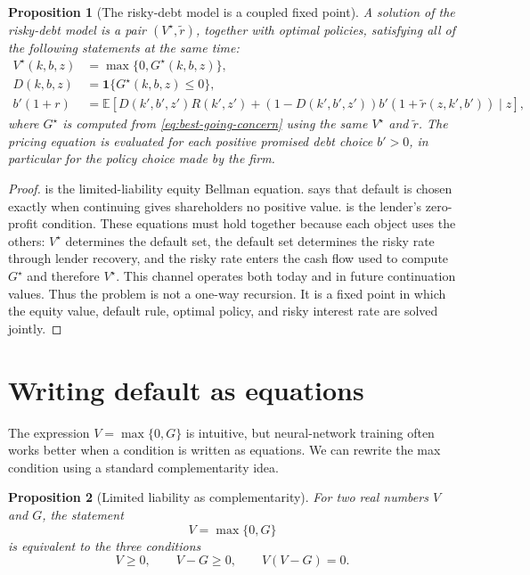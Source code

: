 \documentclass[11pt]{article}
\newtheorem{proposition}{Proposition}
\newcommand{\E}{\mathbb{E}}
\newcommand{\1}{\mathbf{1}}
\begin{document}
\begin{proposition}[The risky-debt model is a coupled fixed point]
\label{prop:coupled-fixed-point}
A solution of the risky-debt model is a pair \((V^\star,\widetilde r)\), together
with optimal policies, satisfying all of the following statements at the same
time:
\begin{align}
  V^\star(k,b,z)
  &=
  \max\{0,G^\star(k,b,z)\}, \label{eq:fixed-point-equity}\\
  D(k,b,z)
  &=
  \1\{G^\star(k,b,z)\le 0\}, \label{eq:fixed-point-default}\\
  b'(1+r)
  &=
  \E\left[
    D(k',b',z')R(k',z')
    +(1-D(k',b',z'))b'(1+\widetilde r(z,k',b'))
    \mid z
  \right],
  \label{eq:fixed-point-pricing}
\end{align}
where \(G^\star\) is computed from \cref{eq:best-going-concern} using the same
\(V^\star\) and \(\widetilde r\). The pricing equation is evaluated for each
positive promised debt choice \(b'>0\), in particular for the policy choice made
by the firm.
\end{proposition}

\begin{proof}
 is the limited-liability equity Bellman equation.
 says that default is chosen exactly when
continuing gives shareholders no positive value. 
is the lender's zero-profit condition. These equations must hold together
because each object uses the others: \(V^\star\) determines the default set, the
default set determines the risky rate through lender recovery, and the risky
rate enters the cash flow used to compute \(G^\star\) and therefore
\(V^\star\). This channel operates both today and in future continuation values.
Thus the problem is not a one-way recursion. It is a fixed point in which the
equity value, default rule, optimal policy, and risky interest rate are solved
jointly.
\end{proof}

\section{Writing default as equations}

The expression \(V=\max\{0,G\}\) is intuitive, but neural-network training often
works better when a condition is written as equations. We can rewrite the max
condition using a standard complementarity idea.

\begin{proposition}[Limited liability as complementarity]
\label{prop:limited-liability-complementarity}
For two real numbers \(V\) and \(G\), the statement
\[
  V=\max\{0,G\}
\]
is equivalent to the three conditions
\begin{equation}
  V\ge 0,\qquad V-G\ge 0,\qquad V(V-G)=0.
  \label{eq:complementarity}
\end{equation}
\end{proposition}
\end{document}
